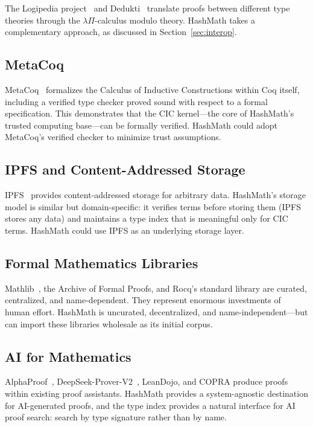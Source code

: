 \documentclass[11pt]{article}
\theoremstyle{definition}
\theoremstyle{plain}
\theoremstyle{remark}
\begin{document}
The Logipedia project~\cite{logipedia} and Dedukti~\cite{dedukti} translate proofs between
different type theories through the $\lambda\Pi$-calculus modulo theory.
HashMath takes a complementary approach, as discussed in Section~\ref{sec:interop}.

\subsection{MetaCoq}

MetaCoq~\cite{metacoq} formalizes the Calculus of Inductive Constructions within Coq itself,
including a verified type checker proved sound with respect to a formal specification.
This demonstrates that the CIC kernel---the core of HashMath's trusted computing base---can
be formally verified.
HashMath could adopt MetaCoq's verified checker to minimize trust assumptions.

\subsection{IPFS and Content-Addressed Storage}

IPFS~\cite{ipfs} provides content-addressed storage for arbitrary data.
HashMath's storage model is similar but domain-specific: it verifies terms before storing them
(IPFS stores any data) and maintains a type index that is meaningful only for CIC terms.
HashMath could use IPFS as an underlying storage layer.

\subsection{Formal Mathematics Libraries}

Mathlib~\cite{mathlib}, the Archive of Formal Proofs, and Rocq's standard library are curated,
centralized, and name-dependent.
They represent enormous investments of human effort.
HashMath is uncurated, decentralized, and name-independent---but can import these libraries
wholesale as its initial corpus.

\subsection{AI for Mathematics}

AlphaProof~\cite{alphaproof}, DeepSeek-Prover-V2~\cite{deepseek}, LeanDojo, and COPRA
produce proofs within existing proof assistants.
HashMath provides a system-agnostic destination for AI-generated proofs, and the type index
provides a natural interface for AI proof search: search by type signature rather than by name.
\end{document}
